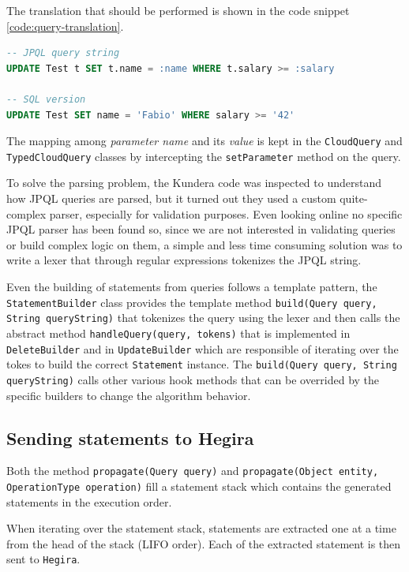 \noindent The translation that should be performed is shown in the code snippet \ref{code:query-translation}.

\begin{lstlisting}[language=SQL, caption=JPQL to SQL translation, label=code:query-translation, numbers=none]
-- JPQL query string
UPDATE Test t SET t.name = :name WHERE t.salary >= :salary

-- SQL version
UPDATE Test SET name = 'Fabio' WHERE salary >= '42'
\end{lstlisting} 

\noindent The mapping among \textit{parameter name} and its \textit{value} is kept in the \texttt{CloudQuery} and \texttt{TypedCloudQuery} classes by intercepting the \texttt{setParameter} method on the query.

\newparagraph To solve the parsing problem, the Kundera code was inspected to understand how JPQL queries are parsed, but it turned out they used a custom quite-complex parser, especially for validation purposes. Even looking online no specific JPQL parser has been found so, since we are not interested in validating queries or build complex logic on them, a simple and less time consuming solution was to write a lexer that through regular expressions tokenizes the JPQL string.

\noindent Even the building of statements from queries follows a template pattern, the \texttt{StatementBuilder} class provides the template method \texttt{build(Query query, String queryString)} that tokenizes the query using the lexer and then calls the abstract method \texttt{handleQuery(query, tokens)} that is implemented in \texttt{DeleteBuilder} and in \texttt{UpdateBuilder} which are responsible of iterating over the tokes to build the correct \texttt{Statement} instance.
The \texttt{build(Query query, String queryString)} calls other various hook methods that can be overrided by the specific builders to change the algorithm behavior.

\subsection{Sending statements to Hegira}
Both the method \texttt{propagate(Query query)} and \texttt{propagate(Object entity, OperationType operation)} fill a statement stack which contains the generated statements in the execution order.

\noindent When iterating over the statement stack, statements are extracted one at a time from the head of the stack (LIFO order). Each of the extracted statement is then sent to \texttt{Hegira}.

